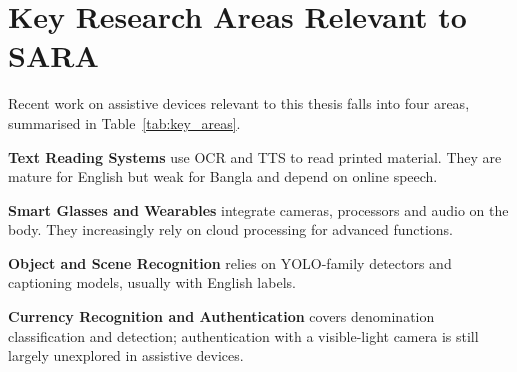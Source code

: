 \section{Key Research Areas Relevant to SARA}

Recent work on assistive devices relevant to this thesis falls into four areas, summarised in Table~\ref{tab:key_areas}.

\textbf{Text Reading Systems} use OCR and TTS to read printed material. They are mature for English but weak for Bangla and depend on online speech.

\textbf{Smart Glasses and Wearables} integrate cameras, processors and audio on the body. They increasingly rely on cloud processing for advanced functions.

\textbf{Object and Scene Recognition} relies on YOLO-family detectors and captioning models, usually with English labels.

\textbf{Currency Recognition and Authentication} covers denomination classification and detection; authentication with a visible-light camera is still largely unexplored in assistive devices.

